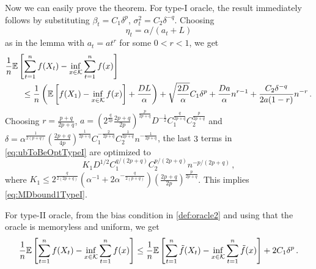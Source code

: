 Now we can easily prove the theorem.
For type-I oracle, the result immediately follows by substituting $\beta_t = C_1\delta^p$, $\sigma^2_t = C_2 \delta^{-q}$. Choosing $$\eta_t = \alpha/(a_t+L)$$ as in the lemma with 
$a_t=a t^r$ for some $0<r<1$, we get
\begin{align}
\MoveEqLeft
\frac{1}{n} \EE{ \sum_{t=1}^n f( X_t) - \inf_{x \in \cK} \sum_{t=1}^n f(x)} \nonumber \\
&\le \frac{1}{n}\left(\EE{f(X_1)-\inf_{x \in \cK}f(x)}+\frac{DL}{\alpha}  \right) +\sqrt{\dfrac{2D}{\alpha}} C_1\delta^p
+\frac{Da}{\alpha} n^{r-1}+\dfrac{C_2 \delta^{-q}}{2a(1-r)}n^{-r} \,.
\label{eq:ubToBeOptTypeI}
 \end{align}
  Choosing $r = \frac{p+q}{2p+q}$,  
 $a = \left(2^{\frac{q}{2p}}\frac{2p+q}{2p}\right)^{\frac{p}{2p+q}} D^{-\frac{1}{2}} C_1^{\frac{q}{2p+q}} C_2^{\frac{p}{2p+q}} $
 and
 $\delta = \alpha^{\frac{1}{2(p+q)}}\left(\frac{2p+q}{4p}\right)^{\frac{1}{2p+q}} C_1^{-\frac{2}{2p+q}} C_2^{\frac{1}{2p+q}}n^{-\frac{1}{2p+q}}$,
the last $3$ terms in \eqref{eq:ubToBeOptTypeI} are optimized to
 \[
 K_1 D^{1/2} C_1^{q/(2p+q)} C_2^{p/(2p+q)} n ^{-p/(2p+q)} \,,
 \]
 where
 $K_1 \le 2^{\frac{q}{2(2p+q)}} \left( \alpha^{-1}+2\alpha^{-\frac{q}{2(p+q)}} \right) \left( \frac{2p+q}{2p} \right)^{\frac{p}{2p+q}}$. This implies \eqref{eq:MDbound1TypeI}.

For type-II oracle, from the bias condition in \cref{def:oracle2} and using that the oracle is memoryless and uniform, we get
\begin{align*}
 \frac{1}{n} \mathbb{E}\left[ \sum_{t=1}^n f(X_t) - \inf_{x \in \mathcal{K}}\sum_{t=1}^n f(x) \right]
 \le \frac{1}{n}\mathbb{E}\left[ \sum_{t=1}^n \tilde{f}(X_t) - \inf_{x \in \mathcal{K}}\sum_{t=1}^n \tilde{f}(x) \right] +2C_1 \delta^p
 \,.
\end{align*}

